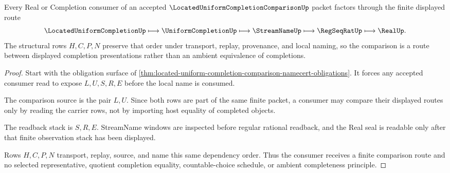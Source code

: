 \begin{theorem}
\label{thm:located-uniform-completion-comparison-finite-route}
Every Real or Completion consumer of an accepted $\LocatedUniformCompletionComparisonUp$ packet factors through the finite displayed route
$$
\LocatedUniformCompletionUp \longmapsto \UniformCompletionUp \longmapsto \StreamNameUp \longmapsto \RegSeqRatUp \longmapsto \RealUp .
$$
The structural rows $H,C,P,N$ preserve that order under transport, replay, provenance, and local naming, so the comparison is a route between displayed completion presentations rather than an ambient equivalence of completions.
\end{theorem}
\begin{proof}
Start with the obligation surface of \autoref{thm:located-uniform-completion-comparison-namecert-obligations}. It forces any accepted consumer read to expose $L,U,S,R,E$ before the local name is consumed.

The comparison source is the pair $L,U$. Since both rows are part of the same finite packet, a consumer may compare their displayed routes only by reading the carrier rows, not by importing host equality of completed objects.

The readback stack is $S,R,E$. StreamName windows are inspected before regular rational readback, and the Real seal is readable only after that finite observation stack has been displayed.

Rows $H,C,P,N$ transport, replay, source, and name this same dependency order. Thus the consumer receives a finite comparison route and no selected representative, quotient completion equality, countable-choice schedule, or ambient completeness principle.
\end{proof}



